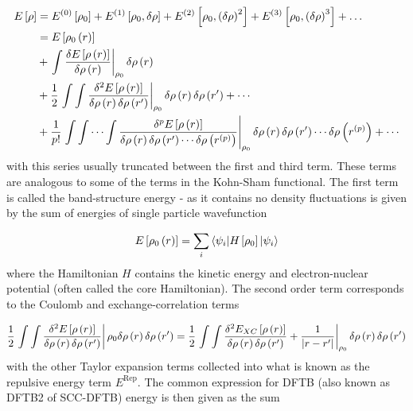 \begin{equation}
    \begin{split}
    E\left[\rho\right] &= E^{\left(0\right)}\left[\rho_0\right] + E^{\left(1\right)}\left[\rho_0, \delta\rho\right] + E^{\left(2\right)}\left[\rho_0, \left(\delta\rho\right)^2\right] + E^{\left(3\right)}\left[\rho_0, \left(\delta\rho\right)^3\right] + \dots \\
    &= E_{} \left[ \rho_0\left(r\right) \right] \\
    &+ \left. \int \frac{\delta E_{} \left[ \rho\left(r\right) \right]}{\delta \rho\left(r\right)} \right\rvert_{\rho_0}  \delta \rho \left( r \right) \\
    &+ \frac{1}{2} \left. \int\int \frac{\delta^2 E_{} \left[ \rho\left(r\right) \right]}{\delta \rho\left(r\right)\delta \rho\left(r^\prime\right)} \right\rvert_{\rho_0} \delta \rho \left( r \right) \delta \rho \left( r^\prime \right) + \cdots \\
    &+ \frac{1}{p!} \left. \int\int \cdots\int \frac{\delta^p E_{} \left[ \rho\left(r\right) \right]}{\delta \rho\left(r\right)\delta \rho\left(r^\prime\right) \cdots \delta \rho\left(r^{\left(p\right)}\right)} \right\rvert_{\rho_0} \delta \rho \left( r \right) \delta \rho \left( r^\prime \right) \cdots \delta \rho\left(r^{\left(p\right)}\right) + \cdots
    \end{split}
\end{equation}
%
with this series usually truncated between the first and third term\cite{Gaus2011}. 
These terms are analogous to some of the terms in the Kohn-Sham functional. The 
first term is called the band-structure energy - as it contains no density fluctuations
is given by the sum of energies of single particle wavefunction

\begin{equation}
    E_{} \left[ \rho_0\left(r\right) \right] =  \sum_i \braket{\psi_i|H_{} \left[ \rho_0 \right]|\psi_i}
\end{equation}
%
where the Hamiltonian $H$ contains the kinetic energy and electron-nuclear potential
(often called the core Hamiltonian). The second order term corresponds to the Coulomb 
and exchange-correlation terms

\begin{equation}
    \frac{1}{2} \left. \int\int \frac{\delta^2 E_{} \left[ \rho\left(r\right) \right]}{\delta \rho\left(r\right)\delta \rho\left(r^\prime\right)} \right\rvert {\rho_0} \delta \rho \left( r \right) \delta \rho \left( r^\prime \right) = \frac{1}{2} \left. \int\int \frac{\delta^2 E_{XC} \left[ \rho\left(r\right) \right]}{\delta \rho\left(r\right)\delta \rho\left(r^\prime\right)} + \frac{1}{\left\lvert r-r^\prime \right\rvert} \right\rvert_{\rho_0} \delta \rho \left( r \right) \delta \rho \left( r^\prime \right)
\end{equation}
%
with the other Taylor expansion terms collected into what is known as the repulsive
energy term $E^\text{Rep}$. The common expression for DFTB (also known as DFTB2
of SCC-DFTB) energy is then given as the sum

